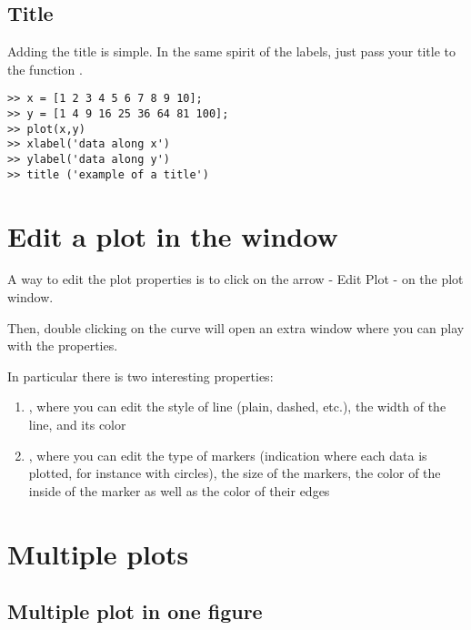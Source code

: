 	\subsection{Title}
		Adding the title is simple.
		In the same spirit of the labels, just pass your title to the function .
\begin{lstlisting}
>> x = [1 2 3 4 5 6 7 8 9 10];
>> y = [1 4 9 16 25 36 64 81 100];
>> plot(x,y)
>> xlabel('data along x')
>> ylabel('data along y')
>> title ('example of a title')
\end{lstlisting}


\section{Edit a plot in the window}
	A way to edit the plot properties is to click on the arrow - Edit Plot - on the plot window.


	Then, double clicking on the curve will open an extra window where you can play with the properties.

	In particular there is two interesting properties:
	\begin{enumerate}
		\item {}, where you can edit the style of line (plain, dashed, etc.), the width of the line, and its color
		\item {}, where you can edit the type of markers (indication where each data is plotted, for instance with circles), the size of the markers, the color of the inside of the marker as well as the color of their edges
	\end{enumerate}

\section{Multiple plots}
	\subsection{Multiple plot in one figure}
